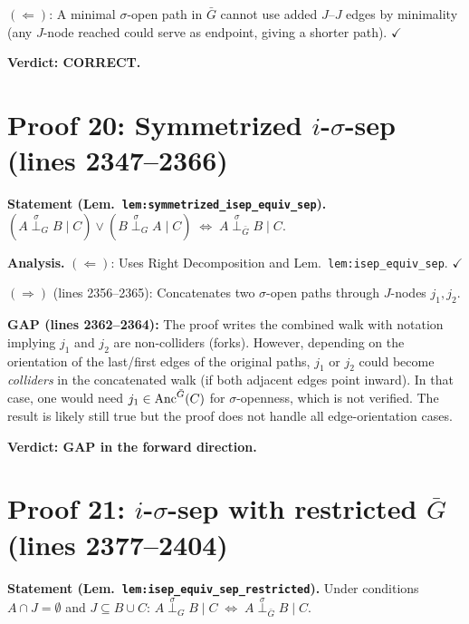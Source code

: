 \documentclass{article}
\begin{document}
$(\Leftarrow)$: A minimal $\sigma$-open path in $\bar G$ cannot use added $J$--$J$
edges by minimality (any $J$-node reached could serve as endpoint, giving a shorter
path).  $\checkmark$

\textbf{Verdict: CORRECT.}

\section{Proof 20: Symmetrized $i$-$\sigma$-sep (lines 2347--2366)}

\textbf{Statement (Lem.\ \texttt{lem:symmetrized\_isep\_equiv\_sep}).}
$(A\stackrel{\sigma}{\perp}_G B\mid C) \lor (B\stackrel{\sigma}{\perp}_G A\mid C)
\;\iff\; A\stackrel{\sigma}{\perp}_{\bar G} B\mid C$.

\textbf{Analysis.}
$(\Leftarrow)$: Uses Right Decomposition and Lem.~\texttt{lem:isep\_equiv\_sep}.  $\checkmark$

$(\Rightarrow)$ (lines 2356--2365): Concatenates two $\sigma$-open paths through
$J$-nodes $j_1,j_2$.

\textbf{GAP (lines 2362--2364):}
The proof writes the combined walk with notation implying $j_1$ and $j_2$ are
non-colliders (forks).  However, depending on the orientation of the last/first
edges of the original paths, $j_1$ or $j_2$ could become \emph{colliders} in the
concatenated walk (if both adjacent edges point inward).  In that case, one would
need $j_1\in\mathrm{Anc}^{\bar G}(C)$ for $\sigma$-openness, which is not verified.
The result is likely still true but the proof does not handle all edge-orientation
cases.

\textbf{Verdict: GAP in the forward direction.}

\section{Proof 21: $i$-$\sigma$-sep with restricted $\bar G$ (lines 2377--2404)}

\textbf{Statement (Lem.\ \texttt{lem:isep\_equiv\_sep\_restricted}).}
Under conditions $A\cap J=\emptyset$ and $J\subseteq B\cup C$:
$A\stackrel{\sigma}{\perp}_G B\mid C \;\iff\;
 A\stackrel{\sigma}{\perp}_{\bar G} B\mid C$.
\end{document}
